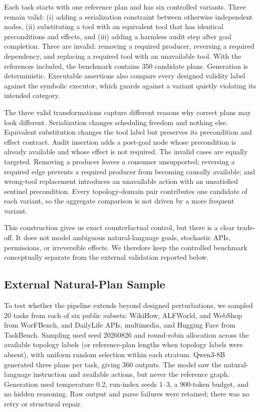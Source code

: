 \documentclass[10pt]{article}
\begin{document}
Each task starts with one reference plan and has six controlled variants. Three
remain valid:
(i) adding a serialization constraint between otherwise independent nodes,
(ii) substituting a tool with an equivalent tool that has identical
preconditions and effects, and (iii) adding a harmless audit step after goal
completion. Three are invalid: removing a required producer, reversing a
required dependency, and replacing a required tool with an unavailable tool.
With the references included, the benchmark contains 350 candidate plans.
Generation is deterministic. Executable assertions also compare every designed
validity label against the symbolic executor, which guards against a variant
quietly violating its intended category.

The three valid transformations capture different reasons why correct plans
may look different. Serialization changes scheduling freedom and nothing else.
Equivalent substitution changes the tool label but preserves its precondition
and effect contract. Audit insertion adds a post-goal node whose precondition
is already available and whose effect is not required. The invalid cases are
equally targeted. Removing a producer leaves a consumer unsupported; reversing
a required edge prevents a required producer from becoming causally available;
and wrong-tool replacement introduces an unavailable action with an
unsatisfied sentinel precondition. Every topology-domain pair contributes one
candidate of each variant, so the aggregate comparison is not driven by a more
frequent variant.

This construction gives us exact counterfactual control, but there is a clear
trade-off. It does not model ambiguous natural-language goals, stochastic APIs,
permissions, or irreversible effects. We therefore keep the controlled
benchmark conceptually separate from the external validation reported below.

\subsection{External Natural-Plan Sample}
To test whether the pipeline extends beyond designed perturbations, we sampled
20 tasks from each of six public subsets: WikiHow, ALFWorld, and WebShop from
WorFBench, and DailyLife APIs, multimedia, and Hugging Face from TaskBench.
Sampling used seed 20260826 and round-robin allocation across the available
topology labels (or reference-plan lengths when topology labels were absent),
with uniform random selection within each stratum.
Qwen3-8B generated three plans per task, giving 360 outputs. The model saw the
natural-language instruction and available actions, but never the reference
graph. Generation used temperature 0.2, run-index seeds 1--3, a 900-token
budget, and no hidden reasoning. Raw output and parse failures were retained;
there was no retry or structural repair.
\end{document}
